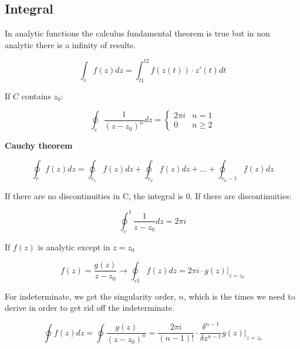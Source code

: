 \documentclass[letterpaper]{article}
\newcommand{\divline}{\noindent\makebox[\linewidth]{\rule{\textwidth}{0.4pt}}}
\begin{document}
	\begin{multicols}{2}
		\section{Integral}
			In analytic functions the calculus fundamental theorem is true but in non analytic there is a infinity of results.
			
			\[\int_{c}f(z)dz = \int_{t1}^{t2}f(z(t)) \cdot z'(t) dt\]
			
			If \(C\) contains \(z_0\):
			
			\[\oint_{c}\frac{1}{(z-z_0)^n}dz = 
				\begin{cases} 
					2 \pi i & n = 1 \\
					0 & n \geq 2
				\end{cases}
			\]
			
			\textbf{Cauchy theorem}
			
			\[\oint_{c} f(z)dz = \oint_{c_1}f(z)dz + \oint_{c_2}f(z)dz + ... + \oint_{c_n-1}f(z)dz\]
			
			If there are no discontinuities in C, the integral is 0. If there are discontinuities:
			
			\[\oint_{c}^{1}\frac{1}{z-z_0}dz = 2 \pi i\]
			
			If \(f(z)\) is analytic except in \(z = z_0\)
			
			\[f(z) = \frac{g(z)}{z - z_0} \to \oint_{c1}f(z)dz = 2 \pi i \cdot g(z) |_{z=z_0}\]
			
			For indeterminate, we get the singularity order, \(n\), which is the times we need to derive in order to get rid off the indeterminate. 
			
			\[\oint f(z)dz = \oint \frac{g(z)}{(z-z_0)^{n}} = \frac{2 \pi i}{(n-1)!} \cdot \frac{\delta^{n-1}}{\delta z^{n-1}} g(z) |_{z=z_0} \]			
	\end{multicols}
 
	\divline
 
\end{document}
